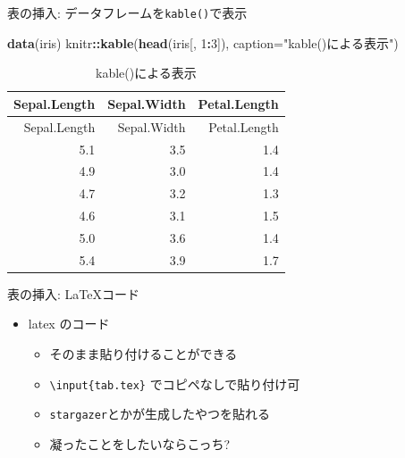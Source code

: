 \documentclass[14pt,ignorenonframetext,]{beamer}
\newenvironment{Shaded}{\begin{snugshade}}{\end{snugshade}}
\newcommand{\DataTypeTok}[1]{\textcolor[rgb]{0.13,0.29,0.53}{#1}}
\newcommand{\DecValTok}[1]{\textcolor[rgb]{0.00,0.00,0.81}{#1}}
\newcommand{\KeywordTok}[1]{\textcolor[rgb]{0.13,0.29,0.53}{\textbf{#1}}}
\newcommand{\NormalTok}[1]{#1}
\newcommand{\OperatorTok}[1]{\textcolor[rgb]{0.81,0.36,0.00}{\textbf{#1}}}
\newcommand{\StringTok}[1]{\textcolor[rgb]{0.31,0.60,0.02}{#1}}
\providecommand{\tightlist}{%
  \setlength{\itemsep}{0pt}\setlength{\parskip}{0pt}}
\begin{document}
\begin{frame}[fragile]{表の挿入: データフレームを\texttt{kable()}で表示}
\protect\hypertarget{ux8868ux306eux633fux5165-ux30c7ux30fcux30bfux30d5ux30ecux30fcux30e0ux3092kableux3067ux8868ux793a}{}

\begin{Shaded}
\begin{Highlighting}[]
\KeywordTok{data}\NormalTok{(iris)}
\NormalTok{knitr}\OperatorTok{::}\KeywordTok{kable}\NormalTok{(}\KeywordTok{head}\NormalTok{(iris[, }\DecValTok{1}\OperatorTok{:}\DecValTok{3}\NormalTok{]),}
             \DataTypeTok{caption=}\StringTok{"kable()による表示"}\NormalTok{)}
\end{Highlighting}
\end{Shaded}

\begin{longtable}[]{@{}rrr@{}}
\caption{kable()による表示}\tabularnewline
\toprule
Sepal.Length & Sepal.Width & Petal.Length\tabularnewline
\midrule
\endfirsthead
\toprule
Sepal.Length & Sepal.Width & Petal.Length\tabularnewline
\midrule
\endhead
5.1 & 3.5 & 1.4\tabularnewline
4.9 & 3.0 & 1.4\tabularnewline
4.7 & 3.2 & 1.3\tabularnewline
4.6 & 3.1 & 1.5\tabularnewline
5.0 & 3.6 & 1.4\tabularnewline
5.4 & 3.9 & 1.7\tabularnewline
\bottomrule
\end{longtable}

\end{frame}

\begin{frame}[fragile]{表の挿入: LaTeXコード}
\protect\hypertarget{ux8868ux306eux633fux5165-latexux30b3ux30fcux30c9}{}

\begin{itemize}
\tightlist
\item
  latex のコード

  \begin{itemize}
  \tightlist
  \item
    そのまま貼り付けることができる
  \item
    \texttt{\textbackslash{}input\{tab.tex\}} でコピペなしで貼り付け可
  \item
    \texttt{stargazer}とかが生成したやつを貼れる
  \item
    凝ったことをしたいならこっち?
  \end{itemize}
\end{itemize}

\begin{Shaded}
\end{Shaded}



\end{frame}
\end{document}
